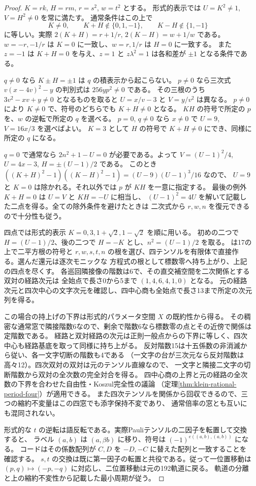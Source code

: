 \begin{proof}
$K=rk$, $H=rm$, $r=s^2$, $w=t^2$ とする。
形式的表示では $U=K^2\ne1$, $V=H^2\ne0$ を常に満たす。
通常条件はこの上で
\[
 K\ne0,\qquad K+H\notin\{0,1,-1\},\qquad K-H\notin\{1,-1\}
\]
に等しい。実際 $2(K+H)=r+1/r$, $2(K-H)=w+1/w$ である。
$w=-r,-1/r$ は $K=0$ に一致し、$w=r,1/r$ は $H=0$ に一致する。
また $z=-1$ は $K+H=0$ を与え、$z=1$ と $z\lambda^2=1$ は各和差が $\pm1$ となる条件である。

$q\ne0$ なら $K\pm H=\pm1$ は $q$ の積表示から起こらない。
$p\ne0$ なら三次式 $v(x-4v)^2-y$ の判別式は $256yp^2\ne0$ である。
その三根のうち $3v^2-xv+y\ne0$ となるものを取ると $U=x/v-3$ と $V=y/v^2$ は異なる。
$p\ne0$ により $K\ne0$ で、符号のどちらでも $K+H\ne0$ となる。
$KH$ の符号で所定の $p$ を、$w$ の逆転で所定の $q$ を選べる。
$p=0$, $q\ne0$ なら $x\ne0$ で $U=9$, $V=16x/3$ を選べばよい。
$K=3$ として $H$ の符号で $K+H\ne0$ にでき、同様に所定の $q$ になる。

$q=0$ で通常なら $2n^2+1-U=0$ が必要である。よって
$V=(U-1)^2/4$, $U=4x-3$, $H=\pm(U-1)/2$ である。
このとき $((K+H)^2-1)((K-H)^2-1)=(U-9)(U-1)^3/16$ なので、
$U=9$ と $K=0$ は除かれる。それ以外では $p$ が $KH$ を一意に指定する。
最後の例外 $K+H=0$ は $U=V$ と $KH=-U$ に相当し、
$(U-1)^2=4U$ を解いて記載した二点を得る。全ての除外条件を避けたときは
二次式から $r,w,n$ を復元できるので十分性も従う。

四点では形式的表示 $K=0,3,1+\sqrt2,1-\sqrt2$ を順に用いる。
初めの二つで $H=(U-1)/2$、後の二つで $H=-K$ とし、$n^2=(U-1)/2$ を取る。
 は17の上で二平方根の符号と
$r,w,s,t,n$ の根を選び、四テンソルを有限体で直接作る。選んだ還元は逐次モニックな
方程式の根として標数零へ持ち上がり、上記の四点を尽くす。
各巡回隣接像の階数は6で、その直交補空間を二次関係とする双対の経路次元は
全始点で長さ0から5まで $(1,4,6,4,1,0)$ となる。
元の経路次元と四次中心の文字次元を確認し、四中心商も全始点で長さ13まで所定の次元列を得る。

この場合の持上げの下界は形式的パラメータ空間 $X$ の既約性から得る。
その稠密な通常窓で隣接階数6なので、剰余で階数6なら標数零の点とその近傍で関係は定階数である。
経路と双対経路の次元は正則一般点からの下界に等しく、四次中心も経路基底を取って同様に持ち上がる。
反対階数15は十五係数の非消滅から従い、各一文字切断の階数も4である
（一文字の台が三次元なら反対階数は高々12）。四次双対の双対は元のテンソル直線なので、
一文字と隣接二文字の切断階数から双対の全次数の完全対合を得る。
四中心商の上界と元の経路の全次数の下界を合わせた自由性・Koszul完全性の議論
（定理\ref{thm:klein-rational-period-four}）が適用できる。
また四次テンソルを関係から回収できるので、三つの縮約不変量はこの四窓でも添字保持不変であり、
通常倍率の窓とも互いにも混同されない。

形式的な $t$ の逆転は語反転である。実際Pauliテンソルの二因子を転置して交換すると、
ラベル $(a,b)$ は $(a,\beta b)$ に移り、符号は $(-1)^{e((a,b),(a,b))}$ になる。
コードはその係数配列が $C,D$ を $-D,-C$ に替えた配列と一致することを確認する。
$s,t$ の交換は既に第一因子の転置と共役である。従って一位置移動は
$(p,q)\mapsto(-p,-q)$ に対応し、二位置移動は元の192軌道に戻る。
軌道の分離と上の縮約不変性から記載した最小周期が従う。
\end{proof}

